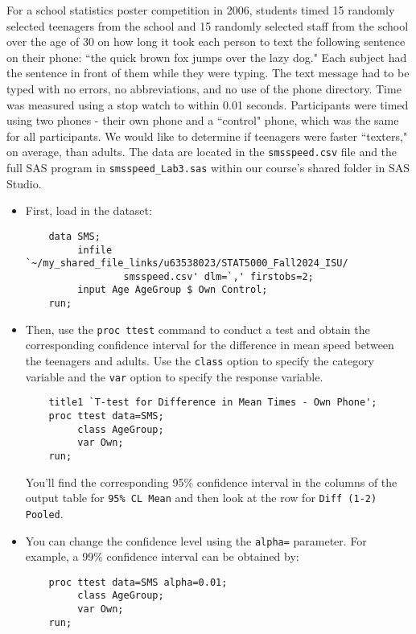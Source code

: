 \documentclass[11pt]{article}
\begin{document}
For a school statistics poster competition in 2006, students timed 15 randomly selected teenagers from the school and 15 randomly selected staff from the school over the age of 30 on how long it took each person to text the following sentence on their phone: ``the quick brown fox jumps over the lazy dog." Each subject had the sentence in front of them while they were typing. The text message had to be typed with no errors, no abbreviations, and no use of the phone directory. Time was measured using a stop watch to within 0.01 seconds. Participants were timed using two phones - their own phone and a ``control" phone, which was the same for all participants. We would like to determine if teenagers were faster ``texters," on average, than adults. The data are located in the \texttt{smsspeed.csv} file and the full SAS program in \texttt{smsspeed\_Lab3.sas} within our course's shared folder in SAS Studio. 
\begin{itemize}
	\item First, load in the dataset:
	\begin{verbatim}
	data SMS;
	     infile `~/my_shared_file_links/u63538023/STAT5000_Fall2024_ISU/
	             smsspeed.csv' dlm=`,' firstobs=2;
	     input Age AgeGroup $ Own Control;
	run;
	\end{verbatim}
	\item Then, use the \texttt{proc ttest} command to conduct a test and obtain the corresponding confidence interval for the difference in mean speed between the teenagers and adults. Use the \texttt{class} option to specify the category variable and the \texttt{var} option to specify the response variable.
	\begin{verbatim}
	title1 `T-test for Difference in Mean Times - Own Phone';
	proc ttest data=SMS; 
	     class AgeGroup;
	     var Own;
	run;
	\end{verbatim}
	
	You'll find the corresponding 95\% confidence interval in the columns of the output table for \texttt{95\% CL Mean} and then look at the row for \texttt{Diff (1-2) Pooled}.
	\item You can change the confidence level using the \texttt{alpha=} parameter. For example, a 99\% confidence interval can be obtained by:
	\begin{verbatim}
	proc ttest data=SMS alpha=0.01; 
	     class AgeGroup;
	     var Own;
	run;
	\end{verbatim}
\end{itemize}
\end{document}
